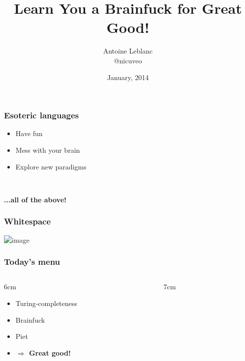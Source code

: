 \documentclass[17pt]{beamer}
\title{Learn You a Brainfuck for Great Good!}
\author{Antoine Leblanc\\\small @nicuveo}
\date{\small{January, 2014}}
\renewcommand{\(}[1]{\begin{columns}[#1]}
\renewcommand{\)}{\end{columns}}
\newcommand{\<}[1]{\begin{column}{#1}}
\renewcommand{\>}{\end{column}}
\begin{document}

\begin{frame}[fragile]
  \titlepage
\end{frame}




\begin{frame}
  \frametitle{Esoteric languages}
  \begin{itemize}
  \item Have fun\alt<1>{?}{!}
  \item Mess with your brain
  \item Explore new paradigms
  \end{itemize}
    \pause ~\\
  \begin{center}
  \textbf{...all of the above!}
  \end{center}
\end{frame}




\begin{frame}
  \frametitle<2>{Whitespace}
  \begin{center}
  \includegraphics<2>{img/lol}
  \end{center}
\end{frame}




\begin{frame}
  \frametitle{Today's menu}

  \({c}
    \<{6cm}
      \begin{itemize}
      \item Turing-completeness
      \item Brainfuck
      \item Piet
      \item<2> \textbf{$\Rightarrow$ Great good!}
      \end{itemize}
    \>
    \<{7cm}
    \>
  \)

\end{frame}
\end{document}
